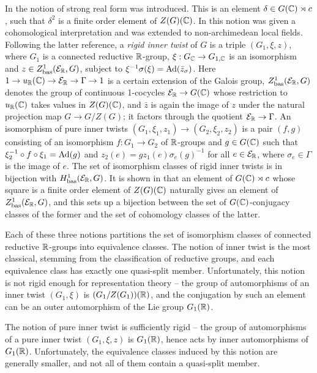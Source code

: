 \documentclass{article}
\theoremstyle{definition}
\numberwithin{equation}{section}
\renewcommand{\-}{\hyp{}}
\begin{document}
In \cite{ABV92} the notion of strong real form was introduced. This is an element $\delta \in G(\mathbb{C}) \rtimes c$, such that $\delta^2$ is a finite order element of $Z(G)(\mathbb{C})$. In \cite{KalRI} this notion was given a cohomological interpretation and was extended to non-archimedean local fields. Following the latter reference, a \emph{rigid inner twist} of $G$ is a triple $(G_1,\xi,z)$, where $G_1$ is a connected reductive $\mathbb{R}$-group, $\xi : G_{\mathbb{C}} \to G_{1,\mathbb{C}}$ is an isomorphism and $z \in Z^1_{\textrm{bas}}(\mathcal{E}_{\mathbb{R}},G)$, subject to $\xi^{-1}\sigma(\xi)=\textrm{Ad}(\bar z_\sigma)$. Here $1 \to u_{\mathbb{R}}(\mathbb{C}) \to \mathcal{E}_{\mathbb{R}} \to \Gamma \to 1$ is a certain extension of the Galois group, $Z^1_{\textrm{bas}}(\mathcal{E}_{\mathbb{R}},G)$ denotes the group of continuous 1-cocycles $\mathcal{E}_{\mathbb{R}} \to G(\mathbb{C})$ whose restriction to $u_{\mathbb{R}}(\mathbb{C})$ takes values in $Z(G)(\mathbb{C})$, and $\bar z$ is again the image of $z$ under the natural projection map $G \to G/Z(G)$; it factors through the quotient $\mathcal{E}_{\mathbb{R}} \to \Gamma$. An isomorphism of pure inner twists $(G_1,\xi_1,z_1) \to (G_2,\xi_2,z_2)$ is a pair $(f,g)$ consisting of an isomorphism $f : G_1 \to G_2$ of $\mathbb{R}$-groups and $g \in G(\mathbb{C})$ such that $\xi_2^{-1}\circ f \circ \xi_1=\textrm{Ad}(g)$ and $z_2(e)=gz_1(e)\sigma_e(g)^{-1}$ for all $e \in \mathcal{E}_{\mathbb{R}}$, where $\sigma_e \in \Gamma$ is the image of $e$. The set of isomorphism classes of rigid inner twists is in bijection with $H^1_{\textrm{bas}}(\mathcal{E}_{\mathbb{R}},G)$. It is shown in \cite[\S5.2]{KalRI} that an element of $G(\mathbb{C}) \rtimes c$ whose square is a finite order element of $Z(G)(\mathbb{C})$ naturally gives an element of $Z^1_{\textrm{bas}}(\mathcal{E}_{\mathbb{R}},G)$, and this sets up a bijection between the set of $G(\mathbb{C})$-conjugacy classes of the former and the set of cohomology classes of the latter.

Each of these three notions partitions the set of isomorphism classes of connected reductive $\mathbb{R}$-groups into equivalence classes. The notion of inner twist is the most classical, stemming from the classification of reductive groups, and each equivalence class has exactly one quasi-split member. Unfortunately, this notion is not rigid enough for representation theory -- the group of automorphisms of an inner twist $(G_1,\xi)$ is $(G_1/Z(G_1))(\mathbb{R})$, and the conjugation by such an element can be an outer automorphism of the Lie group $G_1(\mathbb{R})$.

The notion of pure inner twist is sufficiently rigid -- the group of automorphisms of a pure inner twist $(G_1,\xi,z)$ is $G_1(\mathbb{R})$, hence acts by inner automorphisms of $G_1(\mathbb{R})$. Unfortunately, the equivalence classes induced by this notion are generally smaller, and not all of them contain a quasi-split member.
\end{document}
